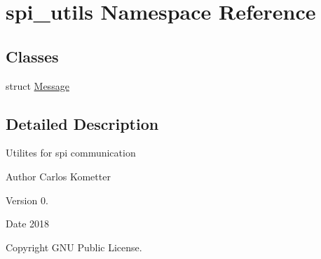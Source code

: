 \hypertarget{namespacespi__utils}{}\section{spi\+\_\+utils Namespace Reference}
\label{namespacespi__utils}
\subsection*{Classes}
\begin{DoxyCompactItemize}
\item 
struct \mbox{\hyperlink{structspi__utils_1_1Message}{Message}}
\end{DoxyCompactItemize}


\subsection{Detailed Description}
Utilites for spi communication \begin{DoxyAuthor}{Author}
Carlos Kometter 
\end{DoxyAuthor}
\begin{DoxyVersion}{Version}
0. 
\end{DoxyVersion}
\begin{DoxyDate}{Date}
2018 
\end{DoxyDate}
\begin{DoxyCopyright}{Copyright}
G\+NU Public License. 
\end{DoxyCopyright}
